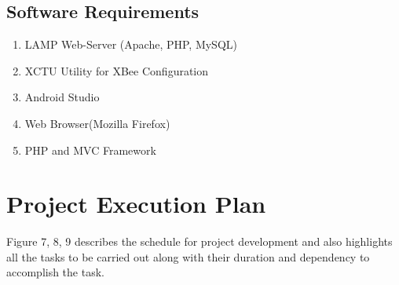 \documentclass[10pt,a4paper]{article}
\begin{document}
\begin{large}
\subsection{Software Requirements}
\end{large}
\begin{enumerate}
\item LAMP Web-Server (Apache, PHP, MySQL)
\item XCTU Utility for XBee Configuration
\item Android Studio 
\item Web Browser(Mozilla Firefox)
\item PHP and MVC Framework 
\end{enumerate}

\newpage
\section{Project Execution Plan}

\quad
 Figure 7, 8, 9 describes the schedule for project development and also highlights all the tasks to be carried out along with their duration and dependency to accomplish the task.
\end{document}
